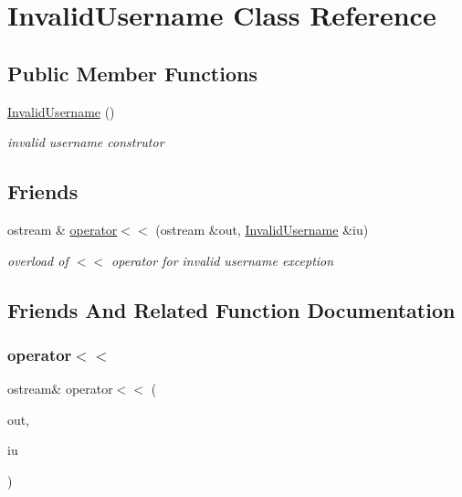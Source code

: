 \hypertarget{class_invalid_username}{}\section{Invalid\+Username Class Reference}
\label{class_invalid_username}
\subsection*{Public Member Functions}
\begin{DoxyCompactItemize}
\item 
\hypertarget{class_invalid_username_afa1b2698f2e9e7e68abb9a5e82a65b7f}{}\label{class_invalid_username_afa1b2698f2e9e7e68abb9a5e82a65b7f} 
\hyperlink{class_invalid_username_afa1b2698f2e9e7e68abb9a5e82a65b7f}{Invalid\+Username} ()
\begin{DoxyCompactList}\small\item\em invalid username construtor \end{DoxyCompactList}\end{DoxyCompactItemize}
\subsection*{Friends}
\begin{DoxyCompactItemize}
\item 
ostream \& \hyperlink{class_invalid_username_a2abb0b0d8c43a608378bb564bde84706}{operator$<$$<$} (ostream \&out, \hyperlink{class_invalid_username}{Invalid\+Username} \&iu)
\begin{DoxyCompactList}\small\item\em overload of $<$$<$ operator for invalid username exception \end{DoxyCompactList}\end{DoxyCompactItemize}


\subsection{Friends And Related Function Documentation}
\hypertarget{class_invalid_username_a2abb0b0d8c43a608378bb564bde84706}{}\label{class_invalid_username_a2abb0b0d8c43a608378bb564bde84706} 
\subsubsection{\texorpdfstring{operator$<$$<$}{operator<<}}
{\footnotesize\ttfamily ostream\& operator$<$$<$ (\begin{DoxyParamCaption}\item[{ostream \&}]{out,  }\item[{\hyperlink{class_invalid_username}{Invalid\+Username} \&}]{iu }\end{DoxyParamCaption})\hspace{0.3cm}{\ttfamily [friend]}}



